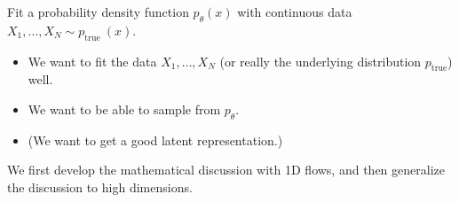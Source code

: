 \documentclass{beamer}
\begin{document}
\begin{frame}[allowframebreaks]

\par\noindent\textcolor{gray}{\hdashrule{\textwidth}{0.4pt}{1pt 2pt}}

Fit a probability density function $p_{\theta}(x)$ with continuous data $X_{1}, \ldots, X_{N} \sim p_{\text {true }}(x)$.

\begin{itemize}
    \item We want to fit the data $X_{1}, \ldots, X_{N}$ (or really the underlying distribution $p_{\text {true}}$) well.
    \item We want to be able to sample from $p_{\theta}$.
    \item (We want to get a good latent representation.)
\end{itemize}

We first develop the mathematical discussion with 1D flows, and then generalize the discussion to high dimensions.

\end{frame}
\end{document}
